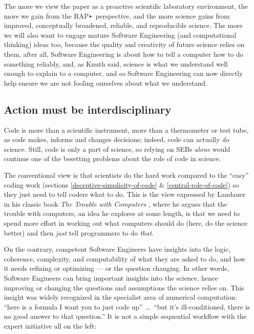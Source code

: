 \documentclass{comjnl}
\def\RAPstar{RAP{\tt +}}
\begin{document}
The more we view the paper as a proactive scientific laboratory environment, the more we gain from the \RAPstar\ perspective, and the more science gains from improved, conceptually broadened, reliable, and reproducible science. The more we will also want to engage mature Software Engineering (and computational thinking) ideas too, because the quality and creativity of future science relies on them, after all, Software Engineering is about how to tell a computer how to do something reliably, and, as Knuth said, science is what we understand well enough to explain to a computer, and so Software Engineering can now directly help ensure we are not fooling ourselves about what we understand.

\subsection{Action must be interdisciplinary}
Code is more than a scientific instrument, more than a thermometer or test tube, as code makes, informs and changes decisions; indeed, code can actually \emph{do\/} science. Still, code is only a part of science, so relying on SEBs \emph{alone\/} would continue one of the besetting problems about the role of code in science. 

The conventional view is that scientists do the hard work compared to the ``easy'' coding work (sections \ref{deceptive-simplicity-of-code} \& \ref{central-role-of-code}) so they just need to tell coders what to do. This is the view expressed by Landauer in his classic book \emph{The Trouble with Computers\/} \cite{landauer,thimbleby-landauer}, where he argues that the trouble with computers, an idea he explores at some length, is that we need to spend more effort in working out what computers should do (here, do the science better) and then \emph{just\/} tell programmers to do \emph{that}.  

On the contrary, competent Software Engineers have insights into the logic, coherence, complexity, and computability of what they are asked to do, and how it needs refining or optimizing --- or the question changing. In other words, Software Engineers can bring important insights into the science, hence improving or changing the questions and assumptions the science relies on. This insight was widely recognized in the specialist area of numerical computation: ``here is a formula I want you to just code up''~\ldots\ ``but it's ill-conditioned, there is no good answer to that question.'' It is not a simple sequential workflow with the expert initiative all on the left:
\end{document}
